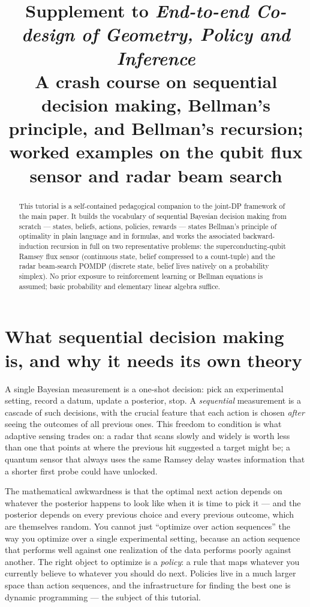 \documentclass[11pt]{article}
\title{Supplement to \emph{End-to-end Co-design of Geometry, Policy and Inference}\\[4pt]
       \large A crash course on sequential decision making, Bellman's principle, and Bellman's recursion;\\
       worked examples on the qubit flux sensor and radar beam search}
\author{}
\date{}
\begin{document}
\maketitle

\begin{abstract}
This tutorial is a self-contained pedagogical companion to the joint-DP framework of the main paper.  It builds the vocabulary of sequential Bayesian decision making from scratch --- states, beliefs, actions, policies, rewards --- states Bellman's principle of optimality in plain language and in formulas, and works the associated backward-induction recursion in full on two representative problems: the superconducting-qubit Ramsey flux sensor (continuous state, belief compressed to a count-tuple) and the radar beam-search POMDP (discrete state, belief lives natively on a probability simplex).  No prior exposure to reinforcement learning or Bellman equations is assumed; basic probability and elementary linear algebra suffice.
\end{abstract}

\tableofcontents

\section{What sequential decision making is, and why it needs its own theory}
\label{sec:intro}

A single Bayesian measurement is a one-shot decision: pick an experimental setting, record a datum, update a posterior, stop.  A \emph{sequential} measurement is a cascade of such decisions, with the crucial feature that each action is chosen \emph{after} seeing the outcomes of all previous ones.  This freedom to condition is what adaptive sensing trades on: a radar that scans slowly and widely is worth less than one that points at where the previous hit suggested a target might be; a quantum sensor that always uses the same Ramsey delay wastes information that a shorter first probe could have unlocked.

The mathematical awkwardness is that the optimal next action depends on whatever the posterior happens to look like when it is time to pick it --- and the posterior depends on every previous choice and every previous outcome, which are themselves random.  You cannot just ``optimize over action sequences'' the way you optimize over a single experimental setting, because an action sequence that performs well against one realization of the data performs poorly against another.  The right object to optimize is a \emph{policy}: a rule that maps whatever you currently believe to whatever you should do next.  Policies live in a much larger space than action sequences, and the infrastructure for finding the best one is dynamic programming --- the subject of this tutorial.
\end{document}
